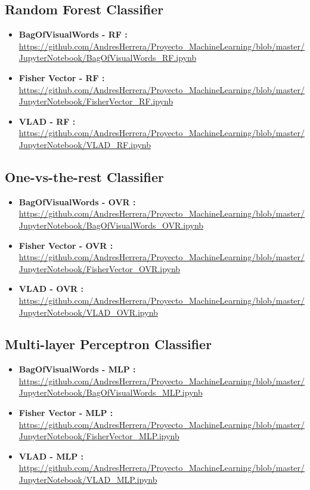 \documentclass[12pt]{article}
\numberwithin{equation}{section}
\numberwithin{table}{section}
\numberwithin{figure}{section}
\begin{document}
\subsection{Random Forest Classifier }

\begin{itemize}
	\item {\textbf{BagOfVisualWords - RF :} } \url{https://github.com/AndresHerrera/Proyecto_MachineLearning/blob/master/JupyterNotebook/BagOfVisualWords_RF.ipynb}
	
	\item {\textbf{Fisher Vector - RF :} } \url{	https://github.com/AndresHerrera/Proyecto_MachineLearning/blob/master/JupyterNotebook/FisherVector_RF.ipynb}
	
	\item {\textbf{VLAD - RF :} } \url{	https://github.com/AndresHerrera/Proyecto_MachineLearning/blob/master/JupyterNotebook/VLAD_RF.ipynb}
	
\end{itemize}


\subsection{One-vs-the-rest Classifier }

\begin{itemize}
	\item {\textbf{BagOfVisualWords - OVR :} } \url{https://github.com/AndresHerrera/Proyecto_MachineLearning/blob/master/JupyterNotebook/BagOfVisualWords_OVR.ipynb}
	
	\item {\textbf{Fisher Vector - OVR :} } \url{	https://github.com/AndresHerrera/Proyecto_MachineLearning/blob/master/JupyterNotebook/FisherVector_OVR.ipynb}
	
	\item {\textbf{VLAD - OVR :} } \url{	https://github.com/AndresHerrera/Proyecto_MachineLearning/blob/master/JupyterNotebook/VLAD_OVR.ipynb}
	
\end{itemize}


\subsection{Multi-layer Perceptron Classifier }

\begin{itemize}
	\item {\textbf{BagOfVisualWords - MLP :} } \url{https://github.com/AndresHerrera/Proyecto_MachineLearning/blob/master/JupyterNotebook/BagOfVisualWords_MLP.ipynb}
	
	\item {\textbf{Fisher Vector - MLP :} } \url{	https://github.com/AndresHerrera/Proyecto_MachineLearning/blob/master/JupyterNotebook/FisherVector_MLP.ipynb}
	
	\item {\textbf{VLAD - MLP :} } \url{	https://github.com/AndresHerrera/Proyecto_MachineLearning/blob/master/JupyterNotebook/VLAD_MLP.ipynb}
	
\end{itemize}
\end{document}
